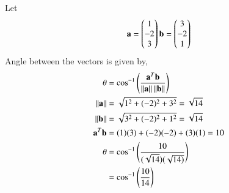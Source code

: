 Let 
\begin{align}
\mathbf{a}=\begin{pmatrix}
1\\
-2\\
3
\end{pmatrix}
\mathbf{b} = \begin{pmatrix}
3\\
-2\\
1
\end{pmatrix}
\end{align}
Angle between the vectors is given by,
\begin{align}
    \theta      &=\cos^{-1}\left(\frac{\mathbf{a}^T\mathbf{b}}{\left\lVert\mathbf{a}\right\rVert\left\lVert\mathbf{b}\right\rVert}\right)\\
    \left\lVert\mathbf{a}\right\rVert&=\sqrt{1^2+(-2)^2+3^2}=\sqrt{14} \\
    \left\lVert\mathbf{b}\right\rVert&=\sqrt{3^2+(-2)^2+1^2}=\sqrt{14}\\
    \mathbf{a}^T\mathbf{b}&=(1)(3)+(-2)(-2)+(3)(1)=10\\
    \theta&=\cos^{-1}\left(\frac{10}{(\sqrt{14})(\sqrt{14)}}\right)\\
    &=\cos^{-1}\left(\frac{10}{14}\right)\\
\end{align}

